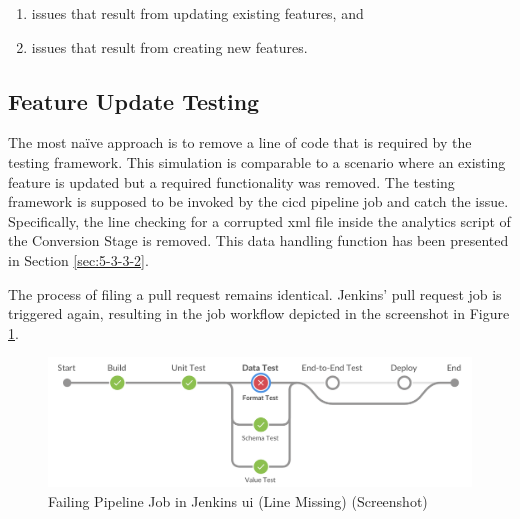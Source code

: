 \begin{enumerate}
	\item issues that result from updating existing features, and
	\item issues that result from creating new features.
\end{enumerate}

\subsection{Feature Update Testing}
The most na\"ive approach is to remove a line of code that is required by the testing framework. This simulation is comparable to a scenario where an existing feature is updated but a required functionality was removed. The testing framework is supposed to be invoked by the \ac{cicd} pipeline job and catch the issue. Specifically, the line checking for a corrupted \ac{xml} file inside the analytics script of the Conversion Stage is removed. This data handling function has been presented in Section \ref{sec:5-3-3-2}.

The process of filing a pull request remains identical. Jenkins' pull request job is triggered again, resulting in the job workflow depicted in the screenshot in Figure \ref{fig:6-jenkins-pr-fail1}.

\begin{figure}[h!]
	\centering
	\includegraphics[width=\linewidth]{main-matter/img/6-jenkins-pr-fail1}
	\caption{Failing Pipeline Job in Jenkins \acs{ui} (Line Missing) (Screenshot)}
	\label{fig:6-jenkins-pr-fail1}
\end{figure}

